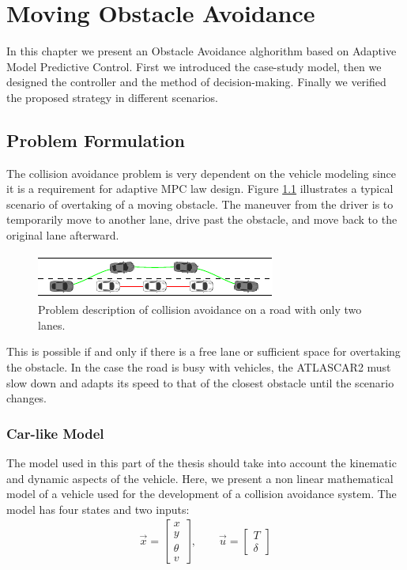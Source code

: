 \chapter{Moving Obstacle Avoidance}
In this chapter we present an Obstacle Avoidance alghorithm based on Adaptive Model Predictive Control. First we introduced the case-study model, then we designed the controller and the method of decision-making. Finally we verified the proposed strategy in different scenarios.

\section{Problem Formulation}
The collision avoidance problem is very dependent on the vehicle modeling since it is a requirement for  adaptive MPC law design. Figure \ref{fig:obstacleAvoidance} illustrates a typical scenario of overtaking of a moving obstacle. The maneuver from the driver is to temporarily move to another lane, drive past the obstacle, and move back to the original lane afterward. 
\begin{figure}[!h]
	\centering
	\includegraphics[width=\textwidth]{./figure/obstacleAvoidance/obstacleAvoidance.pdf}
	\caption{Problem description of collision avoidance on a road with only two lanes.}
	\label{fig:obstacleAvoidance}
\end{figure}

This is possible if and only if there is a free lane or  sufficient space for overtaking the obstacle. In the case the road is busy with vehicles, the ATLASCAR2 must slow down and adapts its speed to that of the closest obstacle until the scenario changes.

\subsection{Car-like Model}
The model used in this part of the thesis should take into account the kinematic and dynamic aspects of the vehicle. Here, we present a non linear mathematical model of a vehicle used for the development of a collision avoidance system. The model has four states and two inputs:
\begin{equation}
\begin{array}{cc}
\vec{x}=\begin{bmatrix}
x\\y\\\theta\\v 
\end{bmatrix},\qquad 
\vec{u}=\begin{bmatrix}
T\\\delta 
\end{bmatrix}
\end{array} 
\end{equation}


